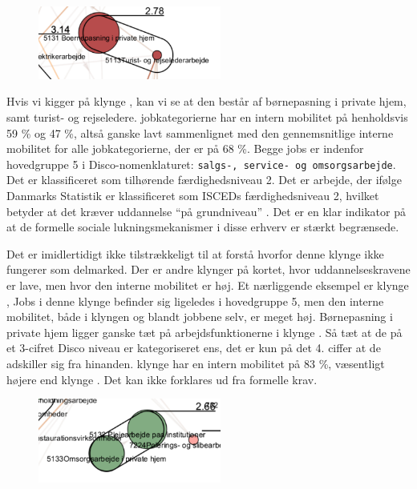 %
\begin{figure}
  \vspace{-20pt}
  \begin{center}
    \includegraphics[width=6cm]{fig/segzoom/seg_2_78.pdf}
   \caption{}
   \label{fig_delanalyse1_zoom_2_78}
  \end{center}
  \vspace{-20pt}
\end{figure}
%

Hvis vi kigger på klynge , kan vi se at den består af børnepasning i private hjem, samt turist- og rejseledere. jobkategorierne har en intern mobilitet på henholdsvis  59 \% og 47 \%, altså ganske lavt sammenlignet med den gennemsnitlige interne mobilitet for alle jobkategorierne, der er på 68 \%.  Begge jobs er indenfor hovedgruppe 5 i Disco-nomenklaturet: \texttt{salgs-, service- og omsorgsarbejde}. Det er klassificeret som tilhørende færdighedsniveau 2. Det er arbejde, der ifølge Danmarks Statistik er klassificeret som ISCEDs færdighedsniveau 2, hvilket betyder at det kræver uddannelse “på grundniveau” \parencite[tabel 1]{DSTDISCO88}. Det er en klar indikator på at de formelle sociale lukningsmekanismer i disse erhverv er stærkt begrænsede.

Det er imidlertidigt ikke tilstrækkeligt til at forstå hvorfor denne klynge ikke fungerer som delmarked. Der er andre klynger på kortet, hvor uddannelseskravene er lave, men hvor den interne mobilitet er høj. Et nærliggende eksempel er klynge , Jobs i denne klynge befinder sig ligeledes i hovedgruppe 5, men den interne mobilitet, både i klyngen og blandt jobbene selv, er meget høj. Børnepasning i private hjem ligger ganske tæt på arbejdsfunktionerne i klynge . Så tæt at de på et 3-cifret Disco niveau er kategoriseret ens, det er kun på det 4. ciffer at de adskiller sig fra hinanden. klynge  har en intern mobilitet på 83 \%, væsentligt højere end klynge . Det kan ikke forklares ud fra formelle krav. 

%
\begin{figure}
  \vspace{-20pt}
  \begin{center}
    \includegraphics[width=6cm]{fig/segzoom/seg_2_66.pdf}
   \caption{}
   \label{fig_delanalyse1_zoom_2_66}
  \end{center}
  \vspace{-20pt}
\end{figure}
%

